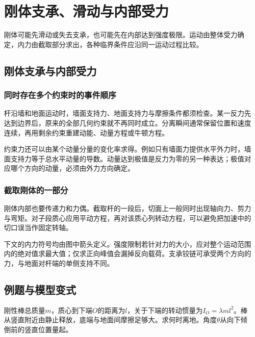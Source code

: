 \section{刚体支承、滑动与内部受力}

刚体可能先滑动或失去支承，也可能先在内部达到强度极限。运动由整体受力确定，内力由截取部分求出，各种临界条件应沿同一运动过程比较。



\subsection{刚体支承与内部受力}
\subsubsection{同时存在多个约束时的事件顺序}
杆沿墙和地面运动时，墙面支持力、地面支持力与摩擦条件都须检查。某一反力先达到边界后，原来的全部几何约束就不再同时成立。分离瞬间通常保留位置和速度连续，再用剩余约束重建动能、动量方程或牛顿方程。

约束力还可以由某个动量分量的变化率求得。例如只有墙面力提供水平外力时，墙面支持力等于总水平动量的导数。动量达到极值是反力为零的另一种表达；极值对应哪个方向的动量，必须由外力方向确定。

\subsubsection{截取刚体的一部分}
刚体内部也要传递力和力偶。截取杆的一段后，切面上一般同时出现轴向力、剪力与弯矩。对子段质心应用平动方程，再对该质心列转动方程，可以避免把加速中的切口误当作固定转轴。

下文的内力符号均由图中箭头定义。强度限制若针对力的大小，应对整个运动范围内的绝对值求最大值；仅求正向峰值会漏掉反向载荷。支承铰链可承受两个方向的力，与地面对杆端的单侧支持不同。


\subsection{例题与模型变式}

\begin{example}[粗糙地面上的刚性棒]\label{ex:hw2-3}

刚性棒总质量$m$，质心到下端$O$的距离为$l$，关于下端的转动惯量为$I_O=\lambda ml^2$。棒从竖直附近由静止释放，底端与地面间摩擦足够大。求何时离地。角度$\theta$从向下倾倒前的竖直位置量起。

\end{example}


